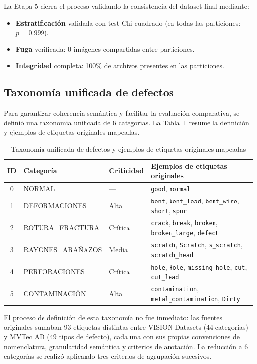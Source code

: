 La Etapa 5 cierra el proceso validando la consistencia del dataset final mediante:
\begin{itemize}
    \item \textbf{Estratificación} validada con test Chi-cuadrado (en todas las particiones: $p=0.999$).
    \item \textbf{Fuga} verificada: 0 imágenes compartidas entre particiones.
    \item \textbf{Integridad} completa: 100\% de archivos presentes en las particiones.
\end{itemize}

\subsection{Taxonomía unificada de defectos}

Para garantizar coherencia semántica y facilitar la evaluación comparativa, se definió una taxonomía unificada de 6 categorías. La Tabla~\ref{tab:fase0_taxonomia} resume la definición y ejemplos de etiquetas originales mapeadas.

\begin{table}[htbp]
\centering
\begin{tabular}{cllp{6.6cm}}
\toprule
\textbf{ID} & \textbf{Categoría} & \textbf{Criticidad} & \textbf{Ejemplos de etiquetas originales} \\
\midrule
0 & NORMAL & --- & \texttt{good}, \texttt{normal} \\
1 & DEFORMACIONES & Alta & \texttt{bent}, \texttt{bent\_lead}, \texttt{bent\_wire}, \texttt{short}, \texttt{spur} \\
2 & \mbox{ROTURA\_FRACTURA} & Crítica & \texttt{crack}, \texttt{break}, \texttt{broken}, \texttt{broken\_large}, \texttt{defect} \\
3 & \mbox{RAYONES\_ARAÑAZOS} & Media & \texttt{scratch}, \texttt{Scratch}, \texttt{s\_scratch}, \texttt{scratch\_head} \\
4 & PERFORACIONES & Crítica & \texttt{hole}, \texttt{Hole}, \texttt{missing\_hole}, \texttt{cut}, \texttt{cut\_lead} \\
5 & CONTAMINACIÓN & Alta & \texttt{contamination}, \texttt{metal\_contamination}, \texttt{Dirty} \\
\bottomrule
\end{tabular}
\caption{Taxonomía unificada de defectos y ejemplos de etiquetas originales mapeadas}
\label{tab:fase0_taxonomia}
\end{table}

El proceso de definición de esta taxonomía no fue inmediato: las fuentes originales sumaban 93 etiquetas distintas entre VISION-Datasets (44 categorías) y MVTec AD (49 tipos de defecto), cada una con sus propias convenciones de nomenclatura, granularidad semántica y criterios de anotación. La reducción a 6 categorías se realizó aplicando tres criterios de agrupación sucesivos.

